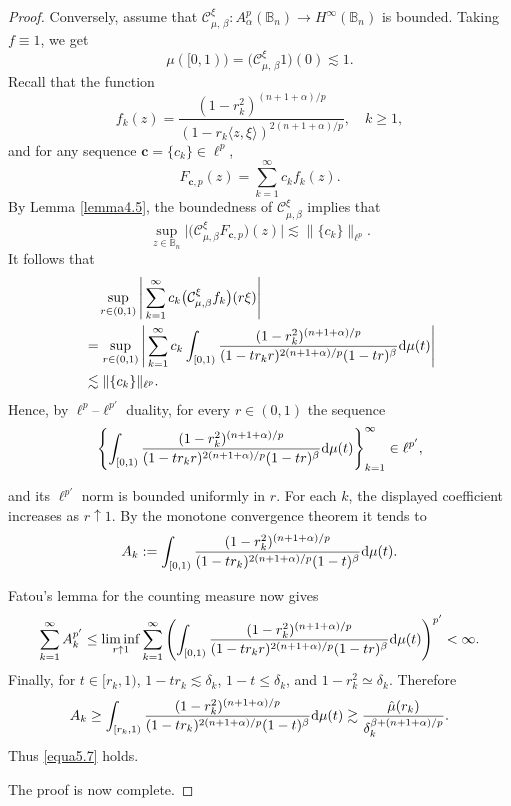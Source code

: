 \documentclass[preprint,12pt,times]{elsarticle}
\theoremstyle{definition}
\theoremstyle{remark}
\numberwithin{equation}{section}
\begin{document}
\begin{proof}
Conversely, assume that $\mathcal{C}_{\mu,\,\beta}^{\xi}: A_{\alpha}^p(\mathbb{B}_n)\to H^{\infty}(\mathbb{B}_n)$ is bounded. Taking $f\equiv 1$, we get
\[
    \mu([0,1))=\big(\mathcal C_{\mu,\,\beta}^{\xi}1\big)(0)\lesssim 1.
\] 
Recall that the function 
\[
    f_k(z)=\frac{(1-r_k^2)^{(n+1+\alpha)/p}}{(1-r_k\langle z,\xi\rangle)^{2(n+1+\alpha)/p}},\quad k\geq 1,
\] 
and for any sequence $\mathbf{c}=\{c_k\}\in \ell^p$,
\[
    F_{\mathbf{c},p}(z)=\sum_{k=1}^{\infty}c_kf_k(z).
\]
By Lemma \ref{lemma4.5}, the boundedness of $\mathcal{C}_{\mu,\beta}^{\xi}$ implies that
\begin{equation*}
\sup_{z\in\mathbb{B}_n}\big|\big(\mathcal{C}_{\mu,\beta}^{\xi}F_{\mathbf{c},p}\big)(z)\big|\lesssim \|\{c_k\}\|_{\ell^p}.
\end{equation*} 
It follows that
\begin{align*}
&\quad \sup_{r\in (0,1)}\Bigg|\sum_{k=1}^{\infty}c_k\big(\mathcal{C}_{\mu,\beta}^{\xi}f_k\big)(r\xi)\Bigg|\\
&=\sup_{r\in (0,1)}\Bigg|\sum_{k=1}^{\infty}c_k\int_{[0,1)}\frac{(1-r_k^2)^{(n+1+\alpha)/p}}{(1-tr_kr)^{2(n+1+\alpha)/p}(1-tr)^{\beta}}{\rm d}\mu(t)\Bigg|\\
&\lesssim \|\{c_k\}\|_{\ell^p}.
\end{align*}
Hence, by $\ell^p$--$\ell^{p'}$ duality, for every $r\in (0,1)$ the sequence
\[
   \left\{\int_{[0,1)}\frac{(1-r_k^2)^{(n+1+\alpha)/p}}{(1-tr_kr)^{2(n+1+\alpha)/p}(1-tr)^{\beta}}{\rm d}\mu(t)\right\}_{k=1}^{\infty}
   \in \ell^{p'},
\]

\par\smallskip

{and its $\ell^{p'}$ norm is bounded uniformly in $r$.
For each $k$, the displayed coefficient increases as $r\uparrow1$. By the
monotone convergence theorem it tends to
\[
  A_k:=\int_{[0,1)}
  \frac{(1-r_k^2)^{(n+1+\alpha)/p}}{(1-tr_k)^{2(n+1+\alpha)/p}(1-t)^{\beta}}{\rm d}\mu(t).
\]
}


\par\smallskip

{Fatou's lemma for the counting measure now gives
\[
  \sum_{k=1}^{\infty}A_k^{p'}
  \leq\liminf_{r\uparrow1}\sum_{k=1}^{\infty}
  \left(\int_{[0,1)}\frac{(1-r_k^2)^{(n+1+\alpha)/p}}{(1-tr_kr)^{2(n+1+\alpha)/p}(1-tr)^{\beta}}{\rm d}\mu(t)\right)^{p'}
  <\infty.
\]
Finally, for $t\in[r_k,1)$,
$1-tr_k\lesssim\delta_k$, $1-t\leq\delta_k$, and
$1-r_k^2\simeq\delta_k$. Therefore
\[
  A_k\geq\int_{[r_k,1)}
  \frac{(1-r_k^2)^{(n+1+\alpha)/p}}{(1-tr_k)^{2(n+1+\alpha)/p}(1-t)^{\beta}}{\rm d}\mu(t)
  \gtrsim \frac{\hat\mu(r_k)}{\delta_k^{\beta+(n+1+\alpha)/p}}.
\]
Thus \eqref{equa5.7} holds.}

The proof is now complete.
\end{proof}
\end{document}
